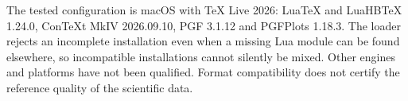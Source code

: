\documentclass[a4paper,11pt]{ltxdoc}
\begin{document}
The tested configuration is macOS with TeX Live 2026: LuaTeX and LuaHBTeX
1.24.0, ConTeXt MkIV 2026.09.10, PGF 3.1.12 and PGFPlots 1.18.3.
The loader rejects an incomplete installation even when a missing Lua module
can be found elsewhere, so incompatible installations cannot silently be mixed.
Other engines and platforms have not been qualified. Format compatibility does
not certify the reference quality of the scientific data.

\clearpage\printindex
\end{document}
